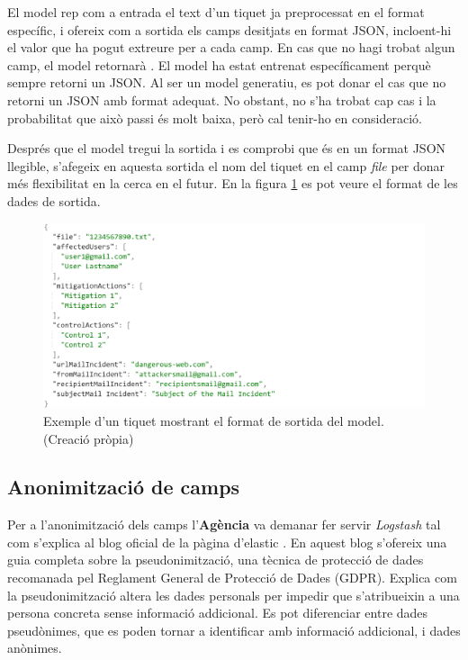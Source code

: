 El model rep com a entrada el text d'un tiquet ja preprocessat en el format específic, i ofereix com a sortida els camps desitjats en format JSON, incloent-hi el valor que ha pogut extreure per a cada camp. En cas que no hagi trobat algun camp, el model retornarà . El model ha estat entrenat específicament perquè sempre retorni un JSON. Al ser un model generatiu, es pot donar el cas que no retorni un JSON amb format adequat. No obstant, no s'ha trobat cap cas i la probabilitat que això passi és molt baixa, però cal tenir-ho en consideració. 

Després que el model tregui la sortida i es comprobi que és en un format JSON llegible, s'afegeix en aquesta sortida el nom del tiquet en el camp \textit{file} per donar més flexibilitat en la cerca en el futur. En la figura \ref{fig:format-sortida-dades} es pot veure el format de les dades de sortida.

\begin{figure}[H]
     \centering
     \includegraphics[width=\textwidth]{format_sortida_dades.png}
     \caption[Format de sortida del model]{Exemple d'un tiquet mostrant el format de sortida del model. \\ (Creació pròpia)}
     \label{fig:format-sortida-dades}
 \end{figure}

\subsection{Anonimització de camps}
Per a l'anonimització dels camps l'\textbf{Agència} va demanar fer servir \textit{Logstash} tal com s'explica al blog oficial de la pàgina d'elastic \cite{Logstash}. En aquest blog s'ofereix una guia completa sobre la pseudonimització, una tècnica de protecció de dades recomanada pel Reglament General de Protecció de Dades (GDPR). Explica com la pseudonimització altera les dades personals per impedir que s'atribueixin a una persona concreta sense informació addicional. Es pot diferenciar entre dades pseudònimes, que es poden tornar a identificar amb informació addicional, i dades anònimes.

